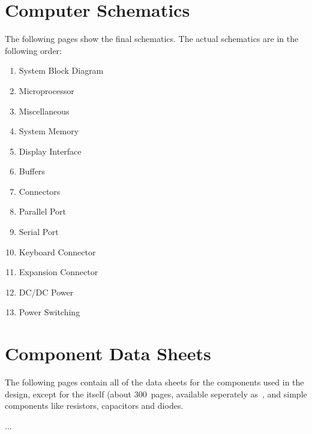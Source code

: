 \documentclass[final]{unswthesis}
\begin{document}
\appendix
\ssp
\chapter{\Elan Computer Schematics}\label{ch:schem}

The following pages show the final \EPC schematics.  The actual
schematics are in the following order:
%
\begin{enumerate}
    \item System Block Diagram
    \item \Elan Microprocessor
    \item Miscellaneous
    \item System Memory
    \item Display Interface
    \item \PCMCIA Buffers
    \item \PCMCIA Connectors
    \item Parallel Port
    \item Serial Port
    \item Keyboard Connector
    \item Expansion Connector
    \item DC/DC Power
    \item Power Switching
\end{enumerate}
%
\clearpage
\addtocounter{page}{13}

\chapter{Component Data Sheets}\label{ch:datasheet}

The following pages contain all of the data sheets for the components
used in the \EPC design, except for the \Elan \AmSC itself (about
300~pages, available seperately as~\cite{ci:data, ci:prm}, and simple
components like resistors, capacitors and diodes.

...
\end{document}
